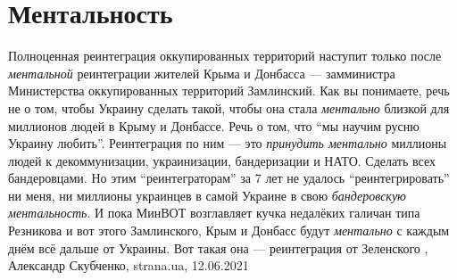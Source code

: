  
 
 
 
 
\chapter{Ментальность}
\label{sec:slova.mentalnost}

Полноценная реинтеграция оккупированных территорий наступит только после
\emph{ментальной} реинтеграции жителей Крыма и Донбасса — замминистра Министерства
оккупированных территорий Замлинский. Как вы понимаете, речь не о том, чтобы
Украину сделать такой, чтобы она стала \emph{ментально} близкой для миллионов людей в
Крыму и Донбассе. Речь о том, что \enquote{мы научим русню Украину любить}.
Реинтеграция по ним — это \emph{принудить ментально} миллионы людей к декоммунизации,
украинизации, бандеризации и НАТО. Сделать всех бандеровцами.  Но этим
\enquote{реинтеграторам} за 7 лет не удалось \enquote{реинтегрировать} ни меня,
ни миллионы украинцев в самой Украине в свою \emph{бандеровскую ментальность}. И пока
МинВОТ возглавляет кучка недалёких галичан типа Резникова и вот этого
Замлинского, Крым и Донбасс будут \emph{ментально} с каждым днём всё дальше от
Украины. Вот такая она — реинтеграция от Зеленского
, 
Александр Скубченко, strana.ua, 12.06.2021

